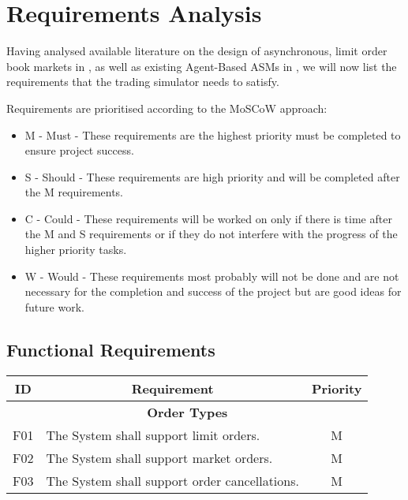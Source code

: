 \section{Requirements Analysis}
Having analysed available literature on the design of asynchronous, limit order book markets in , as well as existing Agent-Based ASMs in , we will now list the requirements that the trading simulator needs to satisfy.

Requirements are prioritised according to the MoSCoW approach:

\begin{itemize}
\item M - Must - These requirements are the highest priority must be completed to ensure project success.
\item S - Should - These requirements are high priority and will be completed after the M requirements.
\item C - Could - These requirements will be worked on only if there is time after the M and S requirements or if they do not interfere with the progress of the higher priority tasks.
\item W - Would - These requirements most probably will not be done and are not necessary for the completion and success of the project but are good ideas for future work.
\end{itemize}

\subsection{Functional Requirements}

\begin{table}[htbp]
\begin{center}
\begin{longtable}{c p{3.5in} c }

\multicolumn{1}{c}{\textbf{ID}}           &
\multicolumn{1}{c}{\textbf{Requirement}}  &
\multicolumn{1}{c}{\textbf{Priority}}     \\              
\toprule

\multicolumn{3}{c}{\textbf{Order Types}}   \\
F01  & The System shall support limit orders.        & M \\
F02  & The System shall support market orders.       & M \\
F03  & The System shall support order cancellations. & M \\
         
\end{longtable}
\end{center}
\end{table}

